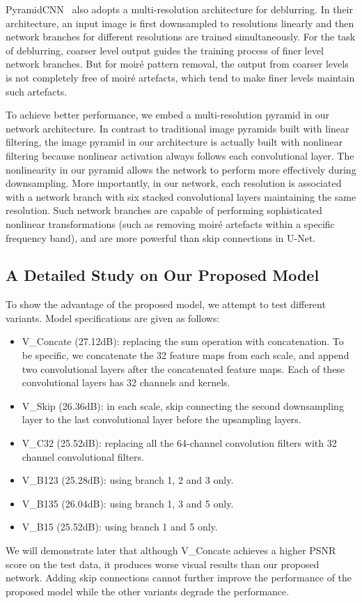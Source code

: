 \documentclass[journal]{IEEEtran}
\begin{document}
PyramidCNN~\cite{nah2016deep} also adopts a multi-resolution architecture for deblurring. In their architecture, an input image is first downsampled to  resolutions linearly and then network branches for different resolutions are trained simultaneously. For the task of deblurring, coarser level output guides the training process of finer level network branches. But for moir\'{e} pattern removal, the output from coarser levels is not completely free of moir\'{e} artefacts, which tend to make finer levels maintain such artefacts.

To achieve better performance, we embed a multi-resolution pyramid in our network architecture. In contrast to traditional image pyramids built with linear filtering, the image pyramid in our architecture is actually built with nonlinear filtering because nonlinear activation always follows each convolutional layer. The nonlinearity in our pyramid allows the network to perform more effectively during downsampling. More importantly, in our network, each resolution is associated with a network branch with six stacked convolutional layers maintaining the same resolution. Such network branches are capable of performing sophisticated nonlinear transformations (such as removing moir\'{e} artefacts within a specific frequency band), and are more powerful than skip connections in U-Net.


\subsection{A Detailed Study on Our Proposed Model}
To show the advantage of the proposed model, we attempt to test different variants. Model specifications  are given as follows:
\begin{itemize}
\item V\_Concate 	(27.12dB): replacing the sum operation with concatenation. To be specific, we concatenate the 32 feature maps from each scale, and append two convolutional layers after the concatenated feature maps. Each of these convolutional layers has 32 channels and  kernels.
\item V\_Skip    		(26.36dB): in each scale, skip connecting the second downsampling layer to the last convolutional layer before the upsampling layers.
\item V\_C32    		(25.52dB): replacing all the 64-channel convolution filters with 32 channel convolutional filters.
\item V\_B123  		(25.28dB): using branch 1, 2 and 3 only.
\item V\_B135  		(26.04dB): using branch 1, 3 and 5 only.
\item V\_B15    		(25.52dB): using branch 1 and 5 only.
\end{itemize}
We will demonstrate later that although V\_Concate achieves a higher PSNR score on the test data, it produces worse visual results than our proposed network. Adding skip connections cannot further improve the performance of the proposed model while the other variants degrade the performance.
\end{document}
